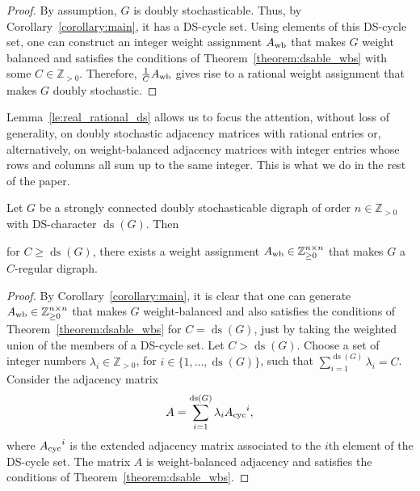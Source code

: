 \documentclass[final]{siamltex}
\begin{document}
\begin{proof}
  By assumption, $ G $ is doubly stochasticable. Thus, by
  Corollary~\ref{corollary:main}, it has a DS-cycle set. Using
  elements of this DS-cycle set, one can construct an integer weight
  assignment $ {{A}_{\textup{{wb}}}} $ that makes $ G $ weight balanced and
  satisfies the conditions of Theorem~\ref{theorem:dsable_wbs} with
  some $ C\in \mathbb{Z}_{>0} $.  Therefore, $
  \frac{1}{C}{{A}_{\textup{{wb}}}} $ gives rise to a rational weight
  assignment that makes $ G $ doubly stochastic.
\end{proof}

Lemma~\ref{le:real_rational_ds} allows us to focus the attention,
without loss of generality, on doubly stochastic adjacency matrices
with rational entries or, alternatively, on weight-balanced adjacency
matrices with integer entries whose rows and columns all sum up to the
same integer. This is what we do in the rest of the paper.

\begin{proposition}\label{prop:C_char}
  Let $ G $ be a strongly connected doubly stochasticable digraph of
  order $ n\in \mathbb{Z}_{>0} $ with DS-character $ {\operatorname{ds}}(G) $. Then
  
  
  
  for $ C\geq {\operatorname{ds}}(G) $, there exists a weight assignment $
  {{A}_{\textup{{wb}}}} \in \mathbb{Z}_{\geq 0}^{n\times n} $ that makes $
  G $ a $ C $-regular digraph.
  
  
  
  
  
\end{proposition}
\begin{proof}
  By Corollary~\ref{corollary:main}, it is clear that one can generate
  $ {{A}_{\textup{{wb}}}} \in \mathbb{Z}_{\geq 0}^{n\times n} $ that makes $
  G $ weight-balanced and also satisfies the conditions of
  Theorem~\ref{theorem:dsable_wbs} for $ C={\operatorname{ds}}(G) $, just by taking
  the weighted union of the members of a DS-cycle set.  Let $ C>{\operatorname{ds}}(G)
  $.  Choose a set of integer numbers $ \lambda_i \in \mathbb{Z}_{> 0}
  $, for $ i \in \{1,\ldots, {\operatorname{ds}}(G)\} $, such that $
  \sum_{i=1}^{{\operatorname{ds}}(G)}\lambda_i=C $.  Consider the adjacency matrix
  \[
  A=\sum_{i=1}^{{\operatorname{ds}}(G)}\lambda_i{{A}_{\textup{{cyc}}}}^i,
  \]
  where $ {{A}_{\textup{{cyc}}}}^i $ is the extended adjacency matrix
  associated to the $ i $th element of the DS-cycle set. The
  matrix $A$ is weight-balanced adjacency and satisfies the conditions
  of Theorem~\ref{theorem:dsable_wbs}.  
\end{proof}
\end{document}
